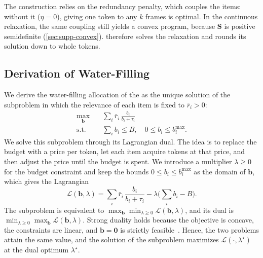 \noindent The construction relies on the redundancy penalty, which couples the items: without it ($\eta=0$), giving one token to any $k$ frames is optimal. In the continuous relaxation, the same coupling still yields a convex program, because $\mathbf S$ is positive semidefinite (\cref{sec:supp-convex}). \name therefore solves the relaxation and rounds its solution down to whole tokens.

\subsection{Derivation of Water-Filling}
\label{sec:supp-waterfill}

We derive the water-filling allocation of the \mainpaper{} as the unique solution of the subproblem in which the relevance of each item is fixed to $\bar r_i>0$:
\begin{equation}
\begin{aligned}
  \max_{\mathbf b}\quad & \sum_i \bar r_i\,\frac{b_i}{b_i+\tau_i}\\
  \text{s.t.}\quad & \sum_i b_i\le B,\quad 0\le b_i\le b_i^{\max} .
\end{aligned}
\label{eq:supp-fixed}
\end{equation}
We solve this subproblem through its Lagrangian dual. The idea is to replace the budget with a price per token, let each item acquire tokens at that price, and then adjust the price until the budget is spent. We introduce a multiplier $\lambda\ge0$ for the budget constraint and keep the bounds $0\le b_i\le b_i^{\max}$ as the domain of $\mathbf b$, which gives the Lagrangian
\begin{equation}
  \mathcal L(\mathbf b,\lambda)=\sum_i \bar r_i\,\frac{b_i}{b_i+\tau_i}-\lambda\Big(\sum_i b_i-B\Big) .
\label{eq:supp-lagrangian}
\end{equation}
The subproblem is equivalent to $\max_{\mathbf b}\min_{\lambda\ge0}\mathcal L(\mathbf b,\lambda)$, and its dual is $\min_{\lambda\ge0}\max_{\mathbf b}\mathcal L(\mathbf b,\lambda)$. Strong duality holds because the objective is concave, the constraints are linear, and $\mathbf b=\mathbf 0$ is strictly feasible~\cite{boyd2004}. Hence, the two problems attain the same value, and the solution of the subproblem maximizes $\mathcal L(\cdot,\lambda^\star)$ at the dual optimum $\lambda^\star$.


